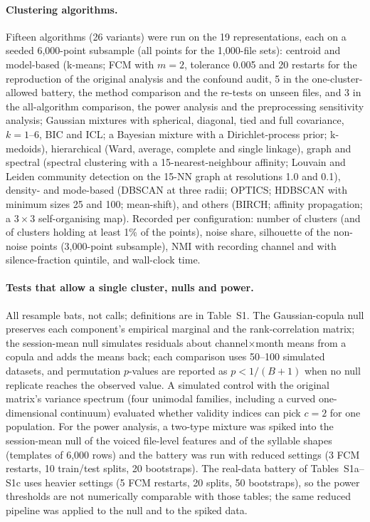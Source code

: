 \documentclass[11pt]{article}
\begin{document}
\paragraph{Clustering algorithms.} Fifteen algorithms (26 variants) were run on the 19 representations, each on a seeded 6,000-point subsample (all points for the 1,000-file sets): centroid and model-based (k-means; FCM with $m=2$, tolerance 0.005 and 20 restarts for the reproduction of the original analysis and the confound audit, 5 in the one-cluster-allowed battery, the method comparison and the re-tests on unseen files, and 3 in the all-algorithm comparison, the power analysis and the preprocessing sensitivity analysis; Gaussian mixtures with spherical, diagonal, tied and full covariance, $k=1$--6, BIC and ICL; a Bayesian mixture with a Dirichlet-process prior; k-medoids), hierarchical (Ward, average, complete and single linkage), graph and spectral (spectral clustering with a 15-nearest-neighbour affinity; Louvain and Leiden community detection on the 15-NN graph at resolutions 1.0 and 0.1), density- and mode-based (DBSCAN at three radii; OPTICS; HDBSCAN with minimum sizes 25 and 100; mean-shift), and others (BIRCH; affinity propagation; a $3\times3$ self-organising map). Recorded per configuration: number of clusters (and of clusters holding at least 1\% of the points), noise share, silhouette of the non-noise points (3,000-point subsample), NMI with recording channel and with silence-fraction quintile, and wall-clock time.

\paragraph{Tests that allow a single cluster, nulls and power.} All resample bats, not calls; definitions are in Table~S1. The Gaussian-copula null preserves each component's empirical marginal and the rank-correlation matrix; the session-mean null simulates residuals about channel$\times$month means from a copula and adds the means back; each comparison uses 50--100 simulated datasets, and permutation $p$-values are reported as $p<1/(B+1)$ when no null replicate reaches the observed value. A simulated control with the original matrix's variance spectrum (four unimodal families, including a curved one-dimensional continuum) evaluated whether validity indices can pick $c=2$ for one population. For the power analysis, a two-type mixture was spiked into the session-mean null of the voiced file-level features and of the syllable shapes (templates of 6,000 rows) and the battery was run with reduced settings (3 FCM restarts, 10 train/test splits, 20 bootstraps). The real-data battery of Tables~S1a--S1c uses heavier settings (5 FCM restarts, 20 splits, 50 bootstraps), so the power thresholds are not numerically comparable with those tables; the same reduced pipeline was applied to the null and to the spiked data.
\end{document}
